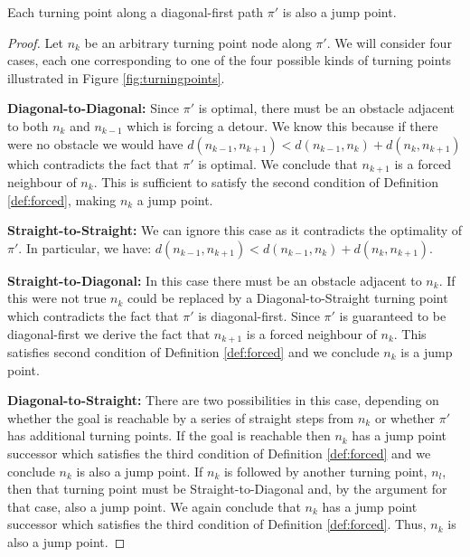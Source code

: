 \begin{lemma}
\label{lemma:turningpoints}
Each turning point along a diagonal-first path $\pi'$ is also a jump point.
\end{lemma}
\begin{proof}
Let $n_{k}$ be an arbitrary turning point node along $\pi'$. 
We will consider four cases, each one corresponding to one of the four
possible kinds of turning points illustrated in Figure \ref{fig:turningpoints}. 

\textbf{Diagonal-to-Diagonal:} Since $\pi'$ is optimal, there must be an
obstacle adjacent to both $n_{k}$ and $n_{k-1}$ which is forcing a detour.
We know this because if there were no obstacle we would have 
$d(n_{k-1}, n_{k+1}) < d(n_{k-1}, n_{k}) + d(n_{k}, n_{k+1})$ which contradicts
the fact that $\pi'$ is optimal.
We conclude that $n_{k+1}$ is a forced neighbour of $n_{k}$.
This is sufficient to satisfy the second condition of Definition
\ref{def:forced}, making $n_{k}$ a jump point.

\textbf{Straight-to-Straight:} We can ignore this case as it contradicts the 
optimality of $\pi'$. In particular, we have: 
$d(n_{k-1}, n_{k+1}) < d(n_{k-1}, n_{k}) + d(n_{k}, n_{k+1})$.

\textbf{Straight-to-Diagonal:} In this case there must be an 
obstacle adjacent to $n_{k}$. 
If this were not true $n_{k}$ could be replaced by a
Diagonal-to-Straight turning point which contradicts the fact that $\pi'$ is
diagonal-first.
Since $\pi'$ is guaranteed to be diagonal-first we derive the fact that $n_{k+1}$ is 
a forced neighbour of $n_{k}$.
This satisfies second condition of Definition \ref{def:forced} and we conclude
$n_{k}$ is a jump point.

\textbf{Diagonal-to-Straight:} There are two possibilities in this case, 
depending on whether the goal is reachable by a series of straight steps
from $n_{k}$ or whether $\pi'$ has additional turning points. If the goal
is reachable then $n_{k}$ has a jump point successor which satisfies the
third condition of Definition \ref{def:forced} and we conclude $n_{k}$ is
also a jump point.
If $n_{k}$ is followed by another turning point, $n_{l}$, then that turning
point must be Straight-to-Diagonal and, by the argument for that case, 
also a jump point.
We again conclude that $n_{k}$ has a jump point successor which satisfies
the third condition of Definition \ref{def:forced}. Thus, $n_{k}$ is
also a jump point.
\end{proof}

